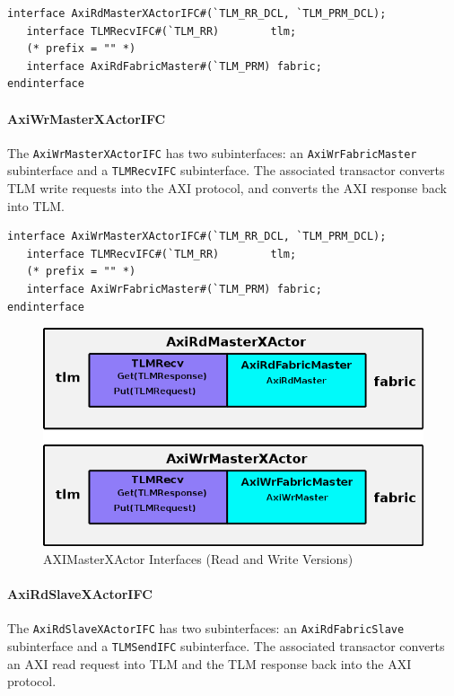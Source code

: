 \documentclass[twoside,letterpaper]{article}
\newcommand{\te}[1]{\texttt{#1}}
\begin{document}

\begin{verbatim}
interface AxiRdMasterXActorIFC#(`TLM_RR_DCL, `TLM_PRM_DCL);
   interface TLMRecvIFC#(`TLM_RR)        tlm;
   (* prefix = "" *)
   interface AxiRdFabricMaster#(`TLM_PRM) fabric;
endinterface
\end{verbatim}

\paragraph{\bf AxiWrMasterXActorIFC} The \te{AxiWrMasterXActorIFC} has two subinterfaces: 
an \te{AxiWrFabricMaster} subinterface and a \te{TLMRecvIFC}
subinterface.  The associated transactor converts TLM write requests
into the AXI protocol, and converts the AXI response back into TLM.


\begin{verbatim}
interface AxiWrMasterXActorIFC#(`TLM_RR_DCL, `TLM_PRM_DCL);
   interface TLMRecvIFC#(`TLM_RR)        tlm;
   (* prefix = "" *)
   interface AxiWrFabricMaster#(`TLM_PRM) fabric;
endinterface
\end{verbatim}


\begin{figure}[ht]
\begin{center}
\includegraphics[height = 2 in]{AXIMasterXActor}
\caption{AXIMasterXActor Interfaces (Read and Write Versions)}
\label{AxiMasterXActor}
\end{center}
\end{figure}


\paragraph{\bf AxiRdSlaveXActorIFC} The \te{AxiRdSlaveXActorIFC} has two subinterfaces:
an \te{AxiRdFabricSlave} subinterface and a \te{TLMSendIFC}
subinterface. The associated transactor converts an AXI read request
into TLM and the TLM response back into the AXI protocol.
\end{document}
